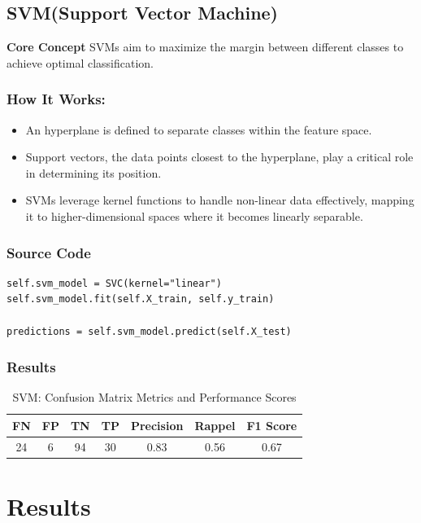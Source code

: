 \documentclass[a4paper,12pt]{article}
\begin{document}
\subsection{SVM(Support Vector Machine)}
\textbf{Core Concept} SVMs aim to maximize the margin between different classes to achieve optimal classification.
\subsubsection*{How It Works:}
\begin{itemize}
    \item An hyperplane is defined to separate classes within the feature space.
    \item Support vectors, the data points closest to the hyperplane, play a critical role in determining its position.
    \item SVMs leverage kernel functions to handle non-linear data effectively, mapping it to higher-dimensional spaces where it becomes linearly separable.
\end{itemize}

\subsubsection*{Source Code}
\begin{lstlisting}[style=python]
self.svm_model = SVC(kernel="linear")
self.svm_model.fit(self.X_train, self.y_train)

predictions = self.svm_model.predict(self.X_test)
\end{lstlisting}

\subsubsection*{Results}
\begin{table}[h!]
\centering
\begin{tabular}{|c|c|c|c|c|c|c|}
\hline
\textbf{FN} & \textbf{FP} & \textbf{TN} & \textbf{TP} & \textbf{Precision} & \textbf{Rappel} & \textbf{F1 Score} \\ \hline
24          & 6           & 94          & 30          & 0.83               & 0.56            & 0.67              \\ \hline
\end{tabular}
\caption{SVM: Confusion Matrix Metrics and Performance Scores}
\end{table}

\section{Results}
\end{document}
